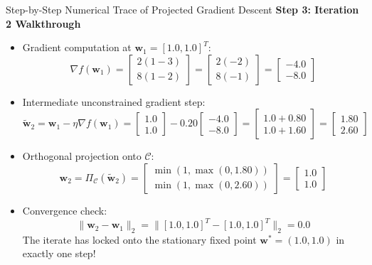 \begin{examplebox}[breakable]{Step-by-Step Numerical Trace of Projected Gradient Descent}
\textbf{Step 3: Iteration 2 Walkthrough}
\begin{itemize}
    \item Gradient computation at $\mathbf{w}_1 = [1.0, 1.0]^T$:
    \begin{equation}
    \nabla f(\mathbf{w}_1) = \begin{bmatrix} 2(1 - 3) \\ 8(1 - 2) \end{bmatrix} = \begin{bmatrix} 2(-2) \\ 8(-1) \end{bmatrix} = \begin{bmatrix} -4.0 \\ -8.0 \end{bmatrix}
    \end{equation}
    \item Intermediate unconstrained gradient step:
    \begin{equation}
    \tilde{\mathbf{w}}_2 = \mathbf{w}_1 - \eta \nabla f(\mathbf{w}_1) = \begin{bmatrix} 1.0 \\ 1.0 \end{bmatrix} - 0.20 \begin{bmatrix} -4.0 \\ -8.0 \end{bmatrix} = \begin{bmatrix} 1.0 + 0.80 \\ 1.0 + 1.60 \end{bmatrix} = \begin{bmatrix} 1.80 \\ 2.60 \end{bmatrix}
    \end{equation}
    \item Orthogonal projection onto $\mathcal{C}$:
    \begin{equation}
    \mathbf{w}_2 = \Pi_{\mathcal{C}}(\tilde{\mathbf{w}}_2) = \begin{bmatrix} \min(1, \max(0, 1.80)) \\ \min(1, \max(0, 2.60)) \end{bmatrix} = \begin{bmatrix} 1.0 \\ 1.0 \end{bmatrix}
    \end{equation}
    \item Convergence check:
    \begin{equation}
    \|\mathbf{w}_2 - \mathbf{w}_1\|_2 = \|[1.0, 1.0]^T - [1.0, 1.0]^T\|_2 = 0.0
    \end{equation}
    The iterate has locked onto the stationary fixed point $\mathbf{w}^* = (1.0, 1.0)$ in exactly one step!
\end{itemize}


\end{examplebox}
